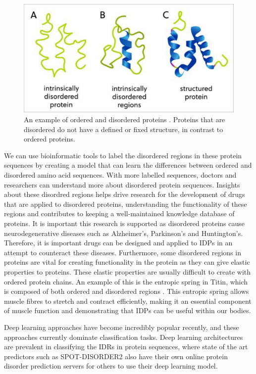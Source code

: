 \documentclass{l4proj}
\begin{document}
\begin{figure}[!htb]
    \centering
    \includegraphics[width=\linewidth]{images/structprot.pdf}

    \caption{An example of ordered and disordered proteins \citep{Tenchov:22}. Proteins that are disordered do not have a defined or fixed structure, in contrast to ordered proteins.}
    \label{fig:structured prot} 
\end{figure}

We can use bioinformatic tools to label the disordered regions in these protein sequences by creating a model that can learn the differences between ordered and disordered amino acid sequences. With more labelled sequences, doctors and researchers can understand more about disordered protein sequences. Insights about these disordred regions helps drive research for the development of drugs that are applied to disordered proteins, understanding the functionality of these regions and contributes to keeping a well-maintained knowledge database of proteins. It is important this research is supported as disordered proteins cause neurodegenerative diseases such as Alzheimer’s, Parkinson’s and Huntington’s. Therefore, it is important drugs can be designed and applied to IDPs in an attempt to counteract these diseases. Furthermore, some disordered regions in proteins are vital for creating functionality in the protein as they can give elastic properties to proteins. These elastic properties are usually difficult to create with ordered protein chains. An example of this is the entropic spring in Titin, which is composed of both ordered and disordered regions \citep{Morgan:17}. This entropic spring allows muscle fibres to stretch and contract efficiently, making it an essential component of muscle function and demonstrating that IDPs can be useful within our bodies.

Deep learning approaches have become incredibly popular recently, and these approaches currently dominate classification tasks. Deep learning architectures are prevalent in classifying the IDRs in protein sequences, where state of the art predictors such as SPOT-DISORDER2 \citep{Hanson:19} also have their own online protein disorder prediction servers for others to use their deep learning model.
\end{document}
